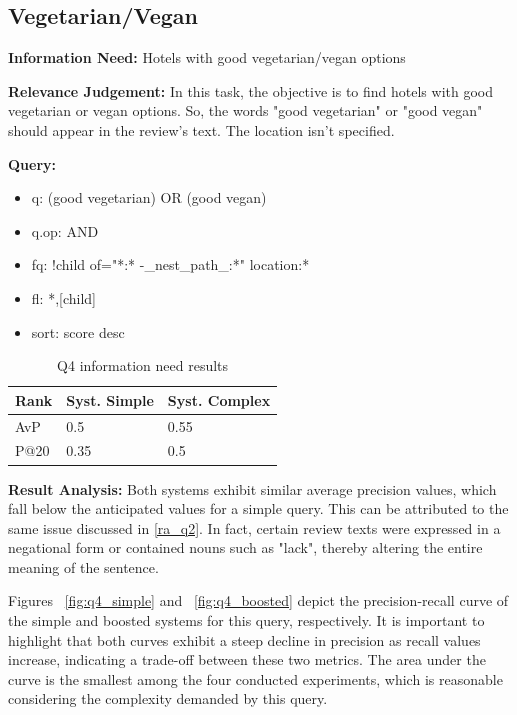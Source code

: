 \documentclass[sigconf]{acmart}
\begin{document}
\subsection{Vegetarian/Vegan}

\textbf{Information Need:} Hotels with good vegetarian/vegan options

\textbf{Relevance Judgement:} In this task, the objective is to find hotels with good vegetarian or vegan options. So, the words "good vegetarian" or "good vegan" should appear in the review's text. The location isn't specified.

\textbf{Query:}

\begin{itemize}
    \item q: (good vegetarian) OR (good vegan)
    \item q.op: AND
    \item fq: {!child of="*:* -\_nest\_path\_:*"} location:*
    \item fl: *,[child]
    \item sort: score desc
\end{itemize}

\begin{table}[h]
\caption{Q4 information need results}
\label{tab:q4}
\begin{tabular}{lll}
\toprule
Rank & Syst. Simple & Syst. Complex\\
\midrule
AvP & 0.5 & 0.55  \\
P@20 & 0.35 & 0.5 \\
\bottomrule
\end{tabular}
\end{table}


\textbf{Result Analysis:} Both systems exhibit similar average precision values, which fall below the anticipated values for a simple query. This can be attributed to the same issue discussed in \ref{ra_q2}. In fact, certain review texts were expressed in a negational form or contained nouns such as "lack", thereby altering the entire meaning of the sentence.

Figures ~\ref{fig:q4_simple} and ~\ref{fig:q4_boosted} depict the precision-recall curve of the simple and boosted systems for this query, respectively. It is important to highlight that both curves exhibit a steep decline in precision as recall values increase, indicating a trade-off between these two metrics. The area under the curve is the smallest among the four conducted experiments, which is reasonable considering the complexity demanded by this query.
\end{document}
